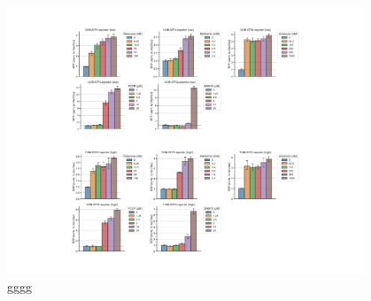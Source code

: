 \begin{figure}
    \centering
    \includegraphics[width=0.95\textwidth]{figures/chap2/app/atf4_ETCtit.pdf}
    \caption[APP GGGG]{
    gggg
    }
    \label{fig:app_ch2:atf4_ETCtit}
\end{figure}




